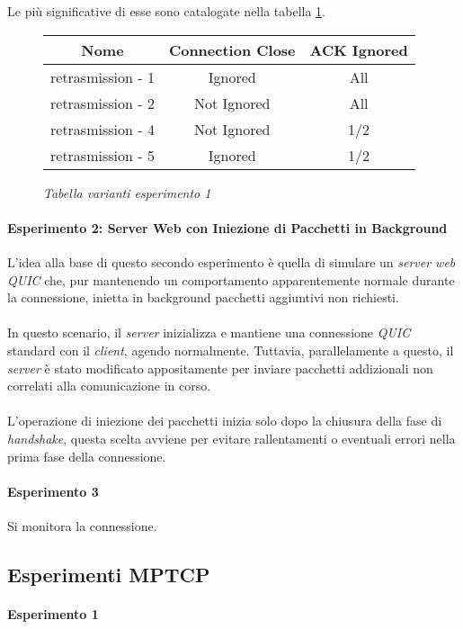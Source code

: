 Le più significative di esse sono catalogate nella tabella \ref{table-retransmission}.
\begin{figure}[!h]
    \centering
    \begin{tabular}{|c|c|c|}
        \hline
        \textbf{Nome} & \textbf{Connection Close} & \textbf{ACK Ignored} \\
        \hline
        retrasmission - 1  & Ignored & All \\
        \hline
        retrasmission - 2 & Not Ignored & All \\
        \hline
        retrasmission - 4 & Not Ignored & 1/2 \\
        \hline
        retrasmission - 5 & Ignored & 1/2 \\
        \hline
    \end{tabular}
    \caption{\emph{Tabella varianti esperimento 1}}
    \label{table-retransmission}
\end{figure}

\paragraph{Esperimento 2: Server Web con Iniezione di Pacchetti in Background}
\indent L'idea alla base di questo secondo esperimento è quella di simulare un \emph{server web QUIC} che, 
pur mantenendo un comportamento apparentemente normale durante la connessione, inietta in background pacchetti aggiuntivi non richiesti.
\\\\
In questo scenario, il \emph{server} inizializza e mantiene una connessione \emph{QUIC} standard con il \emph{client}, agendo normalmente. 
Tuttavia, parallelamente a questo, il \emph{server} è stato modificato appositamente per inviare pacchetti addizionali non correlati alla comunicazione in corso.
\\\\
L'operazione di iniezione dei pacchetti inizia solo dopo la chiusura della fase di \emph{handshake}, questa scelta avviene per evitare rallentamenti o eventuali errori nella prima fase della connessione. 

\paragraph{Esperimento 3}
Si monitora la connessione.

\subsection{Esperimenti MPTCP}
\paragraph{Esperimento 1}

